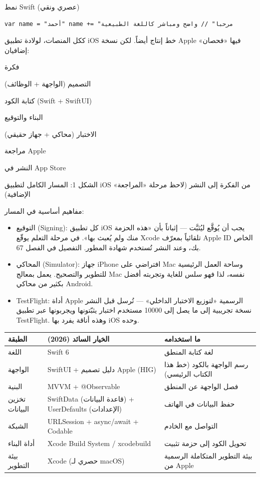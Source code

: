 نمط Swift (عصري ونقي)

\begin{lstlisting}
var name = "أحمد" name += "مرحبا" // واضح ومباشر كاللغة الطبيعية
\end{lstlisting}


ككل المنصات، لولادة تطبيق iOS خط إنتاج أيضاً. لكن نسخة Apple فيها «فحصان» إضافيان:

فكرة

التصميم (الواجهة + الوظائف)

كتابة الكود (Swift + SwiftUI)

البناء والتوقيع

الاختبار (محاكي + جهاز حقيقي)

مراجعة Apple

النشر في App Store

\begin{center}\small\color{gray}الشكل 1: المسار الكامل لتطبيق iOS من الفكرة إلى النشر (لاحظ مرحلة «المراجعة» الإضافية)\end{center}

مفاهيم أساسية في المسار:

\begin{itemize}
  \item التوقيع (Signing): كل تطبيق iOS يجب أن يُوقَّع ليُثبَّت — إثباتاً بأن «هذه الحزمة منك ولم يُعبث بها». في مرحلة التعلم يوقّع Xcode تلقائياً بمعرّف Apple ID الخاص بك، وعند النشر تُستخدم شهادة المطور. التفصيل في الفصل 67.
  \item المحاكي (Simulator): جهاز iPhone افتراضي على Mac وساحة العمل الرئيسية للتطوير والتصحيح. يعمل بمعالج Mac نفسه، لذا فهو سلس للغاية وتجربته أفضل بكثير من محاكي Android.
  \item TestFlight: أداة Apple الرسمية «لتوزيع الاختبار الداخلي» — تُرسل قبل النشر نسخة تجريبية إلى ما يصل إلى 10000 مستخدم اختبار يثبّتونها ويجربونها عبر تطبيق TestFlight. وهذه أناقة يفرد بها iOS وحده.
\end{itemize}


\begin{center}
\begin{tabularx}{\linewidth}{|X|X|X|}
\hline
\textbf{الطبقة} & \textbf{الخيار السائد (2026)} & \textbf{ما استخدامه} \tabularnewline
\hline
اللغة & Swift 6 & لغة كتابة المنطق \tabularnewline
الواجهة & SwiftUI + دليل تصميم Apple (HIG) & رسم الواجهة بالكود (خط هذا الكتاب الرئيسي) \tabularnewline
البنية & MVVM + @Observable & فصل الواجهة عن المنطق \tabularnewline
تخزين البيانات & SwiftData (قاعدة البيانات) + UserDefaults (الإعدادات) & حفظ البيانات في الهاتف \tabularnewline
الشبكة & URLSession + async/await + Codable & التواصل مع الخادم \tabularnewline
أداة البناء & Xcode Build System / xcodebuild & تحويل الكود إلى حزمة تثبيت \tabularnewline
بيئة التطوير & Xcode (حصري لـ macOS) & بيئة التطوير المتكاملة الرسمية من Apple \tabularnewline
\hline
\end{tabularx}
\end{center}

